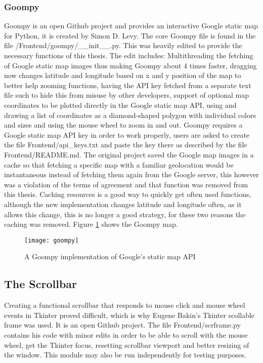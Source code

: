 \subsubsection{Goompy}
Goompy\cite{goompy} is an open Github project and provides an interactive Google static map\cite{googleSM} for Python, it is created by Simon D. Levy.
The core Goompy file is found in the file /Frontend/goompy/\_\_init\_\_.py. This was heavily edited to provide the necessary functions of this thesis. The edit includes: Multithreading the fetching of Google static map images thus making Goompy about 4 times faster, dragging now changes latitude and longitude based on x and y position of the map to better help zooming functions, having the API key fetched from a separate text file such to hide this from misuse by other developers, support of optional map coordinates to be plotted directly in the Google static map API, using and drawing a list of coordinates as a diamond-shaped polygon with individual colors and sizes and using the mouse wheel to zoom in and out. Goompy requires a Google static map API key in order to work properly, users are asked to create the file Frontend/api\_keys.txt and paste the key there as described by the file Frontend/README.md. The original project saved the Google map images in a cache so that fetching a specific map with a familiar geolocation would be instantaneous instead of fetching them again from the Google server, this however was a violation of the terms of agreement and that function was removed from this thesis. Caching resources is a good way to quickly get often used functions, although the new implementation changes latitude and longitude often, as it allows this change, this is no longer a good strategy, for these two reasons the caching was removed.
Figure \ref{fig:the_goompy} shows the Goompy map.

\begin{figure}[ht]
\texttt{[image: goompy]}
\centering
\caption{A Goompy implementation of Google's static map API}
\label{fig:the_goompy}
\end{figure}




\subsection{The Scrollbar}
Creating a functional scrollbar that responds to mouse click and mouse wheel events in Tkinter proved difficult, which is why Eugene Bakin's Tkinter scollable\cite{scrframe} frame was used. It is an open Github project. The file Frontend/scrframe.py contains his code with minor edits in order to be able to scroll with the mouse wheel, get the Tkinter focus, resetting scrollbar viewport and better resizing of the window. This module may also be run independently for testing purposes.




